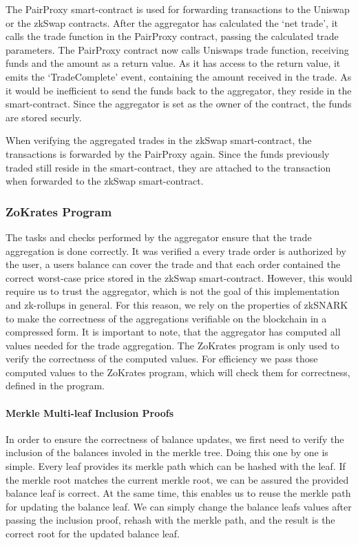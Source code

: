 \documentclass[../../thesis.tex]{subfiles}
\begin{document}
The PairProxy smart-contract is used for forwarding transactions to the Uniswap or the zkSwap contracts. After the aggregator has calculated the `net trade', it calls the trade function in the PairProxy contract, passing the calculated trade parameters. The PairProxy contract now calls Uniswaps trade function, receiving funds and the amount as a return value. As it has access to the return value, it emits the `TradeComplete' event, containing the amount received in the trade. As it would be inefficient to send the funds back to the aggregator, they reside in the smart-contract. Since the aggregator is set as the owner of the contract, the funds are stored securly.

When verifying the aggregated trades in the zkSwap smart-contract, the transactions is forwarded by the PairProxy again. Since the funds previously traded still reside in the smart-contract, they are attached to the transaction when forwarded to the zkSwap smart-contract.


\subsubsection{ZoKrates Program} \label{zokrates}
The tasks and checks performed by the aggregator ensure that the trade aggregation is done correctly. It was verified a every trade order is authorized by the user, a users balance can cover the trade and that each order contained the correct worst-case price stored in the zkSwap smart-contract. However, this would require us to trust the aggregator, which is not the goal of this implementation and zk-rollups in general. For this reason, we rely on the properties of zkSNARK to make the correctness of the aggregations verifiable on the blockchain in a compressed form.  It is important to note, that the aggregator has computed all values needed for the trade aggregation. The ZoKrates program is only used to verify the correctness of the computed values. For efficiency we pass those computed values to the ZoKrates program, which will check them for correctness, defined in the program.

\paragraph{Merkle Multi-leaf Inclusion Proofs} 
In order to ensure the correctness of balance updates, we first need to verify the inclusion of the balances involed in the merkle tree. Doing this one by one is simple. Every leaf provides its merkle path which can be hashed with the leaf. If the merkle root matches the current merkle root, we can be assured the provided balance leaf is correct. At the same time, this enables us to reuse the merkle path for updating the balance leaf. We can simply change the balance leafs values after passing the inclusion proof, rehash with the merkle path, and the result is the correct root for the updated balance leaf. 
\end{document}

